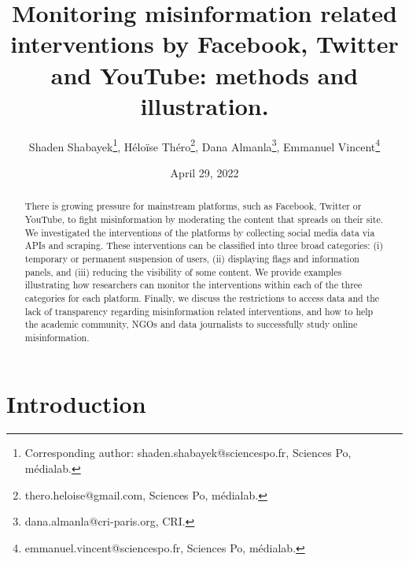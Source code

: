 \documentclass{article}
\begin{document}
\title{Monitoring misinformation related interventions by Facebook, Twitter and YouTube: methods and illustration.}
\author{Shaden Shabayek\footnote{Corresponding author: shaden.shabayek@sciencespo.fr, Sciences Po, m\'{e}dialab.}, H\'{e}lo\"{i}se Th\'{e}ro\footnote{thero.heloise@gmail.com, Sciences Po, m\'{e}dialab.}, Dana Almanla\footnote{dana.almanla@cri-paris.org, CRI.}, Emmanuel Vincent\footnote{emmanuel.vincent@sciencespo.fr, Sciences Po, m\'{e}dialab.}}
\date{April 29, 2022}
\maketitle







\begin{abstract}

There is growing pressure for mainstream platforms, such as Facebook, Twitter or YouTube, to fight misinformation by moderating the content that spreads on their site. We investigated the interventions of the platforms by collecting social media data via APIs and scraping. These interventions can be classified into three broad categories: (i) temporary or permanent suspension of users, (ii) displaying flags and information panels, and (iii) reducing the visibility of some content. We provide examples illustrating how researchers can monitor the interventions within each of the three categories for each platform. Finally, we discuss the restrictions to access data and the lack of transparency regarding misinformation related interventions, and how to help the academic community, NGOs and data journalists to successfully study online misinformation. 
\end{abstract}

\section{Introduction}
\end{document}
